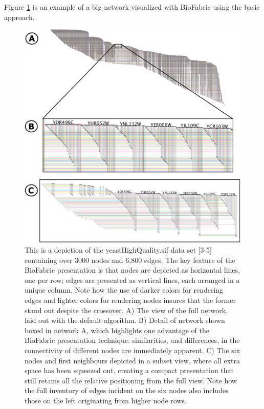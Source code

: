 \documentclass[a4paper,11pt]{kth-mag}
\begin{document}
Figure \ref{fig:bio_default} is an example of a big network visualized with BioFabric using the basic approach.

\begin{figure}[!htbp]
	\centering
	\includegraphics[scale=0.7]{BIODefault}
	\caption{This is a depiction of the yeastHighQuality.sif data set [3-5] containing over 3000 nodes and 6,800 edges.
The key feature of the BioFabric presentation is that nodes are depicted as horizontal lines, one per row; edges are presented as vertical lines,
each arranged in a unique column. Note how the use of darker colors for rendering edges and lighter colors for rendering nodes insures that the
former stand out despite the crossover. A) The view of the full network, laid out with the default algorithm. B) Detail of network shown boxed in
network A, which highlights one advantage of the BioFabric presentation technique: similarities, and differences, in the connectivity of different
nodes are immediately apparent. C) The six nodes and first neighbours depicted in a subset view, where all extra space has been squeezed out,
creating a compact presentation that still retains all the relative positioning from the full view. Note how the full inventory of edges incident on
the six nodes also includes those on the left originating from higher node rows.}
	\label{fig:bio_default}
\end{figure}
\end{document}
